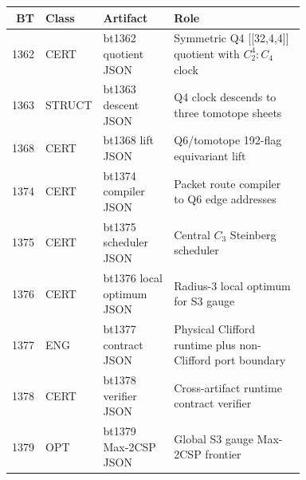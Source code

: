 {\small
\begin{longtable}{r l p{0.25\linewidth} p{0.48\linewidth}}
\toprule
BT & Class & Artifact & Role\\
\midrule
1362 & CERT & bt1362 quotient JSON & Symmetric Q4 [[32,4,4]] quotient with $C_2^4:C_4$ clock\\
1363 & STRUCT & bt1363 descent JSON & Q4 clock descends to three tomotope sheets\\
1368 & CERT & bt1368 lift JSON & Q6/tomotope 192-flag equivariant lift\\
1374 & CERT & bt1374 compiler JSON & Packet route compiler to Q6 edge addresses\\
1375 & CERT & bt1375 scheduler JSON & Central $C_3$ Steinberg scheduler\\
1376 & CERT & bt1376 local optimum JSON & Radius-3 local optimum for S3 gauge\\
1377 & ENG & bt1377 contract JSON & Physical Clifford runtime plus non-Clifford port boundary\\
1378 & CERT & bt1378 verifier JSON & Cross-artifact runtime contract verifier\\
1379 & OPT & bt1379 Max-2CSP JSON & Global S3 gauge Max-2CSP frontier\\
\bottomrule
\end{longtable}
}

